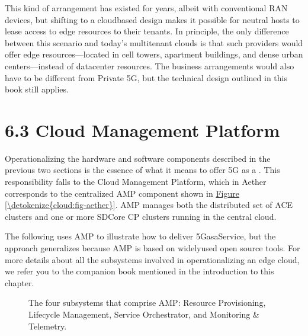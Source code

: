 \documentclass[a4paper,11pt,english]{sphinxmanual}
\let\sphinxpxdimen\pdfpxdimen\else\newdimen\sphinxpxdimen
\begin{document}
\sphinxAtStartPar
This kind of arrangement has existed for years, albeit with
conventional RAN devices, but shifting to a cloud\sphinxhyphen{}based design makes
it possible for neutral hosts to lease access to  edge
resources to their tenants. In principle, the only difference between
this scenario and today’s multi\sphinxhyphen{}tenant clouds is that such providers
would offer edge resources—located in cell towers, apartment
buildings, and dense urban centers—instead of datacenter resources.
The business arrangements would also have to be different from Private
5G, but the technical design outlined in this book still applies.


\section{6.3 Cloud Management Platform}
\label{\detokenize{cloud:cloud-management-platform}}
\sphinxAtStartPar
Operationalizing the hardware and software components described in the
previous two sections is the essence of what it means to offer 5G as a
. This responsibility falls to the Cloud Management
Platform, which in Aether corresponds to the centralized AMP component
shown in \hyperref[\detokenize{cloud:fig-aether}]{Figure \ref{\detokenize{cloud:fig-aether}}}. AMP manages both the
distributed set of ACE clusters and one or more SD\sphinxhyphen{}Core CP clusters
running in the central cloud.

\sphinxAtStartPar
The following uses AMP to illustrate how to deliver 5G\sphinxhyphen{}as\sphinxhyphen{}a\sphinxhyphen{}Service,
but the approach generalizes because AMP is based on widely\sphinxhyphen{}used open
source tools. For more details about all the subsystems involved in
operationalizing an edge cloud, we refer you to the companion book
mentioned in the introduction to this chapter.

\begin{figure}[ht]
\centering
\capstart

\noindent\sphinxincludegraphics[width=600\sphinxpxdimen]{{Slide71}.png}
\caption{The four subsystems that comprise AMP: Resource Provisioning,
Lifecycle Management, Service Orchestrator, and Monitoring \& Telemetry.}\label{\detokenize{cloud:id4}}\label{\detokenize{cloud:fig-amp}}\end{figure}
\end{document}
